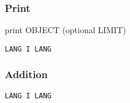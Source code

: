 \subsubsection{Print}
print OBJECT (optional LIMIT)
\begin{verbatim}
LANG I LANG
\end{verbatim}
\begin{normalsize}

\end{normalsize}

\subsubsection{Addition}
\begin{verbatim}
LANG I LANG
\end{verbatim}
\begin{normalsize}

\end{normalsize}